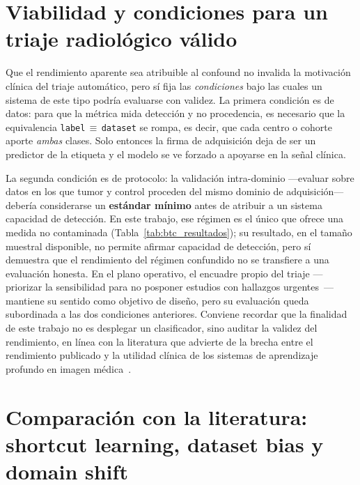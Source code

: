 \section{Viabilidad y condiciones para un triaje radiológico válido}

Que el rendimiento aparente sea atribuible al confound no invalida la motivación
clínica del triaje automático, pero sí fija las \emph{condiciones} bajo las
cuales un sistema de este tipo podría evaluarse con validez. La primera condición
es de datos: para que la métrica mida detección y no procedencia, es necesario
que la equivalencia \texttt{label}\,$\equiv$\,\texttt{dataset} se rompa, es decir,
que cada centro o cohorte aporte \emph{ambas} clases. Solo entonces la firma de
adquisición deja de ser un predictor de la etiqueta y el modelo se ve forzado a
apoyarse en la señal clínica.

La segunda condición es de protocolo: la validación intra-dominio ---evaluar
sobre datos en los que tumor y control proceden del mismo dominio de
adquisición--- debería considerarse un \textbf{estándar mínimo} antes de atribuir
a un sistema capacidad de detección. En este trabajo, ese régimen es el único que
ofrece una medida no contaminada (Tabla~\ref{tab:btc_resultados}); su resultado,
en el tamaño muestral disponible, no permite afirmar capacidad de detección, pero
sí demuestra que el rendimiento del régimen confundido no se transfiere a una
evaluación honesta. En el plano operativo, el encuadre propio del triaje
---priorizar la sensibilidad para no posponer estudios con hallazgos
urgentes~\cite{titano2018cranial}--- mantiene su sentido como objetivo de diseño,
pero su evaluación queda subordinada a las dos condiciones anteriores. Conviene
recordar que la finalidad de este trabajo no es desplegar un clasificador, sino
auditar la validez del rendimiento, en línea con la literatura que advierte de la
brecha entre el rendimiento publicado y la utilidad clínica de los sistemas de
aprendizaje profundo en imagen médica~\cite{litjens2017survey}.

\section{Comparación con la literatura: shortcut learning, dataset bias y domain shift}

